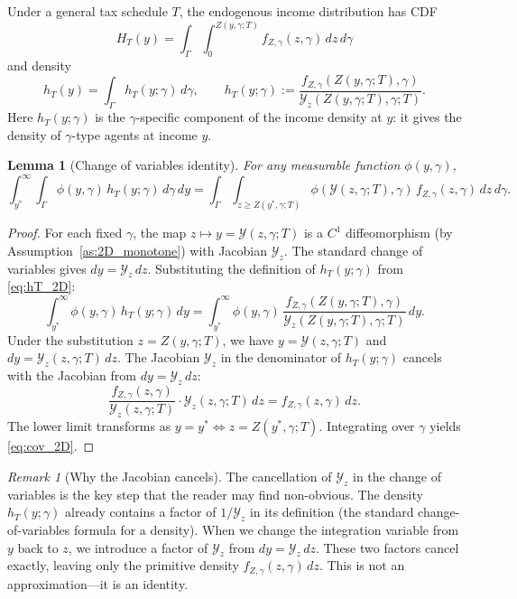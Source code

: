\documentclass[12pt,a4paper]{article}
\theoremstyle{definition}
\theoremstyle{plain}
\newtheorem{lemma}{Lemma}[section]
\theoremstyle{remark}
\newtheorem{remark}{Remark}[section]
\newcommand{\calY}{\mathcal{Y}}
\begin{document}
Under a general tax schedule $T$, the endogenous income distribution has CDF
\[
  H_T(y) = \int_{\Gamma}\int_0^{Z(y,\gamma;T)} f_{Z,\gamma}(z,\gamma)\,dz\,d\gamma
\]
and density
\begin{equation}
\label{eq:hT_2D}
  h_T(y) = \int_{\Gamma} h_T(y;\gamma)\,d\gamma, \qquad
  h_T(y;\gamma) := \frac{f_{Z,\gamma}(Z(y,\gamma;T),\gamma)}{\calY_z(Z(y,\gamma;T),\gamma;T)}.
\end{equation}
Here $h_T(y;\gamma)$ is the $\gamma$-specific component of the income density at $y$: it gives the density of $\gamma$-type agents at income $y$.

\begin{lemma}[Change of variables identity]
\label{lem:cov_2D}
For any measurable function $\phi(y,\gamma)$,
\begin{equation}
\label{eq:cov_2D}
  \int_{y^*}^{\infty}\int_{\Gamma} \phi(y,\gamma)\,h_T(y;\gamma)\,d\gamma\,dy
  = \int_{\Gamma}\int_{z \geq Z(y^*,\gamma;T)} \phi(\calY(z,\gamma;T),\gamma)\,f_{Z,\gamma}(z,\gamma)\,dz\,d\gamma.
\end{equation}
\end{lemma}

\begin{proof}
For each fixed $\gamma$, the map $z \mapsto y = \calY(z,\gamma;T)$ is a $C^1$ diffeomorphism (by Assumption~\ref{as:2D_monotone}) with Jacobian $\calY_z$.  The standard change of variables gives $dy = \calY_z\,dz$.  Substituting the definition of $h_T(y;\gamma)$ from \eqref{eq:hT_2D}:
\[
  \int_{y^*}^{\infty} \phi(y,\gamma)\,h_T(y;\gamma)\,dy
  = \int_{y^*}^{\infty} \phi(y,\gamma)\,\frac{f_{Z,\gamma}(Z(y,\gamma;T),\gamma)}{\calY_z(Z(y,\gamma;T),\gamma;T)}\,dy.
\]
Under the substitution $z = Z(y,\gamma;T)$, we have $y = \calY(z,\gamma;T)$ and $dy = \calY_z(z,\gamma;T)\,dz$.  The Jacobian $\calY_z$ in the denominator of $h_T(y;\gamma)$ cancels with the Jacobian from $dy = \calY_z\,dz$:
\[
  \frac{f_{Z,\gamma}(z,\gamma)}{\calY_z(z,\gamma;T)} \cdot \calY_z(z,\gamma;T)\,dz = f_{Z,\gamma}(z,\gamma)\,dz.
\]
The lower limit transforms as $y = y^* \Leftrightarrow z = Z(y^*,\gamma;T)$.  Integrating over $\gamma$ yields \eqref{eq:cov_2D}.
\end{proof}

\begin{remark}[Why the Jacobian cancels]
\label{rem:jacobian_cancel}
The cancellation of $\calY_z$ in the change of variables is the key step that the reader may find non-obvious.  The density $h_T(y;\gamma)$ already contains a factor of $1/\calY_z$ in its definition (the standard change-of-variables formula for a density).  When we change the integration variable from $y$ back to $z$, we introduce a factor of $\calY_z$ from $dy = \calY_z\,dz$.  These two factors cancel exactly, leaving only the primitive density $f_{Z,\gamma}(z,\gamma)\,dz$.  This is not an approximation---it is an identity.
\end{remark}
\end{document}
